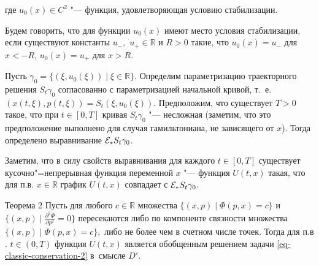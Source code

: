 где $u_0(x)\in C^2$ "--- функция, удовлетворяющая условию стабилизации.



\smallskip



\begin{definition}[13]Будем говорить, что для функции $u_0(x)$ имеют место условия стабилизации, если существуют константы $u_-,$ $u_+\in\mathbb{R}$ и $R>0$ такие, что $u_0(x)=u_-$ для $x<-R$, $u_0(x)=u_+$ для $x>R$.

\end{definition}



\smallskip



Пусть $\gamma_0=\{(\xi,u_0(\xi))\mid \xi\in\mathbb{R}\}$. Определим параметризацию траекторного решения $S_t\gamma_0$ согласованно с параметризацией начальной кривой, т.~е. $(x(t,\xi),p(t,\xi))=S_t(\xi,u_0(\xi))$. Предположим, что существует $T>0$ такое, что при $t\in[0,T]$ кривая $S_t\gamma_0$ "--- несложная (заметим, что это предположение выполнено для случая гамильтониана, не зависящего от $x$). Тогда определено выравнивание ${\cal E}_*S_t\gamma_0$. 

Заметим, что в силу свойств выравнивания для каждого $t\in[0,T]$ существует кусочно"=непрерывная функция переменной $x$ "--- функция $U(t,x)$ такая, что для п.в. $x\in\mathbb{R}$ график $U(t,x)$ совпадает с ${\cal E}_*S_t\gamma_0$.



\smallskip



\hypertarget{newthm2}{}



\begin{newthm}{Теорема 2} Пусть для любого $c\in\mathbb{R}$ множества $\{(x,p)\mid \Phi(p,x)=c\}$ и $\{(x,p)\mid \frac{\partial^2\Phi}{\partial p^2}=0\}$ пересекаются либо по компоненте связности множества $\{(x,p)\mid \Phi(p,x)=c\},$ либо не более чем в счетном числе точек$.$ Тогда для п$.$в$.$ $t\in(0,T)$ функция $U(t,x)$ является обобщенным решением задачи \eqref{eq-classic-conservation-2} в~смысле $D'.$

\end{newthm}



\smallskip



